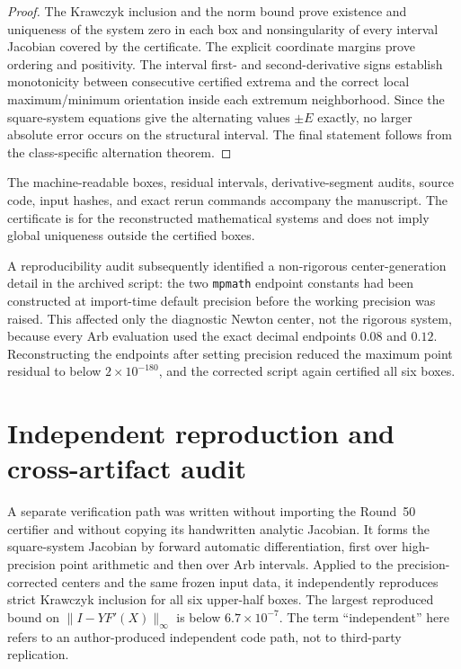\documentclass[preprint,12pt]{elsarticle}
\theoremstyle{remark}
\begin{document}
\begin{proof}
The Krawczyk inclusion and the norm bound prove existence and uniqueness
of the system zero in each box and nonsingularity of every interval
Jacobian covered by the certificate. The explicit coordinate margins
prove ordering and positivity. The interval first- and second-derivative
signs establish monotonicity between consecutive certified extrema and
the correct local maximum/minimum orientation inside each extremum
neighborhood. Since the square-system equations give the alternating
values \(\pm E\) exactly, no larger absolute error occurs on the
structural interval. The final statement follows from the
class-specific alternation theorem.
\end{proof}

The machine-readable boxes, residual intervals, derivative-segment
audits, source code, input hashes, and exact rerun commands accompany
the manuscript. The certificate is for the reconstructed mathematical
systems and does not imply global uniqueness outside the certified
boxes.

A reproducibility audit subsequently identified a non-rigorous
center-generation detail in the archived script: the two \texttt{mpmath}
endpoint constants had been constructed at import-time default
precision before the working precision was raised. This affected only
the diagnostic Newton center, not the rigorous system, because every
Arb evaluation used the exact decimal endpoints \(0.08\) and \(0.12\).
Reconstructing the endpoints after setting precision reduced the
maximum point residual to below \(2\times10^{-180}\), and the corrected
script again certified all six boxes.

\FloatBarrier

\section{Independent reproduction and cross-artifact audit}
\label{sec:round51}

A separate verification path was written without importing the Round~50
certifier and without copying its handwritten analytic Jacobian. It
forms the square-system Jacobian by forward automatic differentiation,
first over high-precision point arithmetic and then over Arb intervals.
Applied to the precision-corrected centers and the same frozen input
data, it independently reproduces strict Krawczyk inclusion for all six
upper-half boxes. The largest reproduced bound on
\(\lVert I-YF'(X)\rVert_\infty\) is below
\(6.7\times10^{-7}\). The term ``independent'' here refers to an
author-produced independent code path, not to third-party replication.
\end{document}
